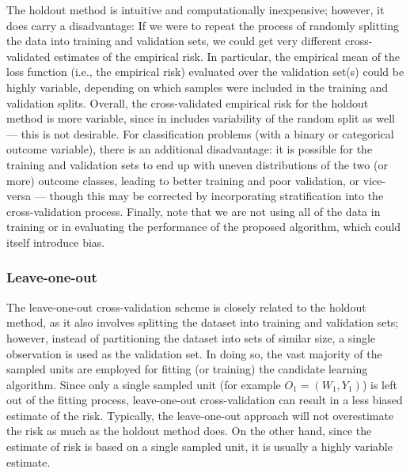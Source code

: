 \documentclass[
  12pt, krantz2,
]{krantz}
\newcommand{\1}{\mathbbm{1}}
\theoremstyle{definition}
\theoremstyle{definition}
\theoremstyle{definition}
\theoremstyle{definition}
\theoremstyle{remark}
\begin{document}
The holdout method is intuitive and computationally inexpensive; however, it
does carry a disadvantage: If we were to repeat the process of randomly
splitting the data into training and validation sets, we could get very
different cross-validated estimates of the empirical risk. In particular, the
empirical mean of the loss function (i.e., the empirical risk) evaluated over
the validation set(s) could be highly variable, depending on which samples were
included in the training and validation splits. Overall, the cross-validated
empirical risk for the holdout method is more variable, since in includes
variability of the random split as well --- this is not desirable. For
classification problems (with a binary or categorical outcome variable), there
is an additional disadvantage: it is possible for the training and validation
sets to end up with uneven distributions of the two (or more) outcome classes,
leading to better training and poor validation, or vice-versa --- though this may
be corrected by incorporating stratification into the cross-validation process.
Finally, note that we are not using all of the data in training or in evaluating
the performance of the proposed algorithm, which could itself introduce bias.

\hypertarget{leave-one-out}{%
\subsubsection{Leave-one-out}\label{leave-one-out}}

The leave-one-out cross-validation scheme is closely related to the holdout
method, as it also involves splitting the dataset into training and validation
sets; however, instead of partitioning the dataset into sets of similar size, a
single observation is used as the validation set. In doing so, the vast majority
of the sampled units are employed for fitting (or training) the candidate
learning algorithm. Since only a single sampled unit (for example \(O_1 = (W_1, Y_1)\)) is left out of the fitting process, leave-one-out cross-validation can
result in a less biased estimate of the risk. Typically, the
leave-one-out approach will not overestimate the risk as much as the holdout
method does. On the other hand, since the estimate of risk is based on a single
sampled unit, it is usually a highly variable estimate.
\end{document}
